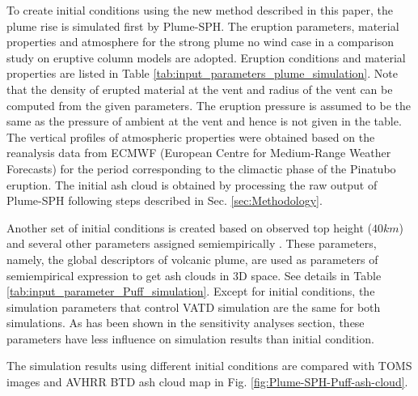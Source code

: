 \documentclass[utf8]{frontiersSCNS} %
\begin{document}
To create initial conditions using the new method described in this paper, the plume rise is simulated first by Plume-SPH. The eruption parameters, material properties and atmosphere for the strong plume no wind case in a comparison study on eruptive column models \citep {costa2016results} are adopted. Eruption conditions and material properties are listed in Table \ref{tab:input_parameters_plume_simulation}. Note that the density of erupted material at the vent and radius of the vent can be computed from the given parameters. The eruption pressure is assumed to be the same as the pressure of ambient at the vent and hence is not given in the table. The vertical profiles of atmospheric properties were obtained based on the reanalysis data from ECMWF (European Centre for Medium-Range Weather Forecasts) for the period corresponding to the climactic phase of the Pinatubo eruption. The initial ash cloud is obtained by processing the raw output of Plume-SPH following steps described in Sec. \ref{sec:Methodology}.

Another set of initial conditions is created based on observed top height ($40 km$) and several other parameters assigned semiempirically \citep{bursik2012estimation}. These parameters, namely, the global descriptors of volcanic plume, are used as parameters of semiempirical expression to get ash clouds in 3D space. See details in Table \ref{tab:input_parameter_Puff_simulation}. Except for initial conditions, the simulation parameters that control VATD simulation are the same for both simulations. As has been shown in the sensitivity analyses section, these parameters have less influence on simulation results than initial condition.

The simulation results using different initial conditions are compared with TOMS images and AVHRR BTD ash cloud map in Fig. \ref{fig:Plume-SPH-Puff-ash-cloud}.
\end{document}
